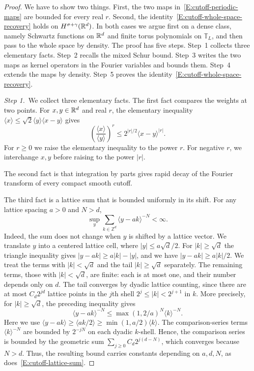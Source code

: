 \begin{proof}
  We have to show two things. First, the two maps
  in~\eqref{E:cutoff-periodic-maps} are bounded for every real $r$. Second, the
  identity~\eqref{E:cutoff-whole-space-recovery} holds on
  $H^{\sigma+\gamma}(\mathbb{R}^d)$. In both cases we argue first on a dense class,
  namely Schwartz functions on $\mathbb{R}^d$ and finite torus polynomials on
  $\mathbb{T}_L$, and then pass to the whole space by density. The proof has
  five steps. Step~1 collects three elementary facts. Step~2 recalls the mixed
  Schur bound. Step~3 writes the two maps as kernel operators in the Fourier
  variables and bounds them. Step~4 extends the maps by density. Step~5 proves
  the identity~\eqref{E:cutoff-whole-space-recovery}.

  \medskip
  \noindent\textit{Step 1.~}We collect three elementary facts. The first fact
  compares the weights at
  two points. For $x,y \in \mathbb{R}^d$ and real $r$, the elementary inequality
  $\langle x\rangle \le \sqrt{2}\langle y\rangle\langle x-y\rangle$ gives
  \begin{equation}\label{E:cutoff-peetre}
    \left(\frac{\langle x\rangle}{\langle y\rangle}\right)^r
    \le 2^{|r|/2}\langle x-y\rangle^{|r|}.
  \end{equation}
  For $r \ge 0$ we raise the elementary inequality to the power $r$. For
  negative $r$, we interchange $x,y$ before raising to the power $|r|$.

  The second fact is that integration by parts gives rapid decay of the Fourier
  transform of every compact smooth cutoff.

  The third fact is a lattice sum that is bounded uniformly in its shift. For
  any lattice spacing $a > 0$ and $N > d$,
  \begin{equation}\label{E:cutoff-lattice-sum}
    \sup_y\sum_{k\in\mathbb{Z}^d}\langle y-ak\rangle^{-N}<\infty.
  \end{equation}
  Indeed, the sum does not change when $y$ is shifted by a lattice vector. We
  translate $y$ into a centered lattice cell, where $|y| \le a\sqrt d/2$. For
  $|k| \ge \sqrt d$ the triangle inequality gives $|y-ak| \ge a|k|-|y|$, and
  we have $|y-ak| \ge a|k|/2$. We treat the terms with $|k| < \sqrt d$ and the
  tail $|k| \ge \sqrt d$ separately. The remaining terms, those with $|k| <
  \sqrt d$, are finite: each is at most one, and their number depends only on
  $d$. The tail converges by dyadic lattice counting, since there are at most
  $C_d2^{jd}$ lattice points in the $j$th shell $2^j \le |k| < 2^{j+1}$ in
  $k$. More precisely, for $|k| \ge \sqrt d$, the preceding inequality gives
  \[
    \langle y-ak\rangle^{-N}
    \le \max(1,2/a)^N\langle k\rangle^{-N}.
  \]
  Here we use $\langle y-ak\rangle \ge \langle ak/2\rangle \ge
  \min(1,a/2)\langle k\rangle$. The comparison-series terms $\langle
  k\rangle^{-N}$ are bounded by $2^{-jN}$ on each dyadic $k$-shell. Hence, the
  comparison series is bounded by the geometric sum $\sum_{j \ge 0}
  C_d2^{j(d-N)}$, which converges because $N > d$. Thus, the resulting bound
  carries constants depending on $a,d,N$, as
  does~\eqref{E:cutoff-lattice-sum}.


\end{proof}
